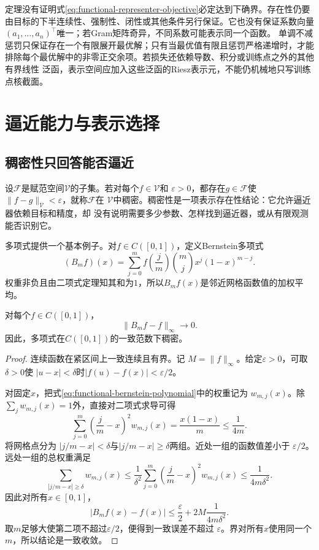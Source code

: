 定理没有证明式\eqref{eq:functional-representer-objective}必定达到下确界。存在性仍要
由目标的下半连续性、强制性、闭性或其他条件另行保证。它也没有保证系数向量
$(a_1,\ldots,a_n)^{\top}$唯一；若Gram矩阵奇异，不同系数可能表示同一个函数。
单调不减惩罚只保证存在一个有限展开最优解；只有当最优值有限且惩罚严格递增时，才能
排除每个最优解中的非零正交余项。若损失还依赖导数、积分或训练点之外的其他有界线性
泛函，表示空间应加入这些泛函的Riesz表示元，不能仍机械地只写训练点核截面。

\section{逼近能力与表示选择}
\label{sec:functional-approximation-capacity-representation}

\subsection{稠密性只回答能否逼近}

设$\mathcal{F}$是赋范空间$\mathcal{V}$的子集。若对每个$f\in\mathcal{V}$和
$\varepsilon>0$，都存在$g\in\mathcal{F}$使
$\lVert f-g\rVert_{\mathcal{V}}<\varepsilon$，就称$\mathcal{F}$在
$\mathcal{V}$中稠密。稠密性是一项表示存在性结论：它允许逼近器依赖目标和精度，却
没有说明需要多少参数、怎样找到逼近器，或从有限观测能否识别它。

多项式提供一个基本例子。对$f\in C([0,1])$，定义Bernstein多项式
\begin{equation}
  (B_mf)(x)
  =
  \sum_{j=0}^{m}
  f\left(\frac{j}{m}\right)
  \binom{m}{j}x^j(1-x)^{m-j}.
  \label{eq:functional-bernstein-polynomial}
\end{equation}
权重非负且由二项式定理知其和为$1$，所以$B_mf(x)$是邻近网格函数值的加权平均。

\begin{theorem}[Bernstein逼近定理]
\label{thm:functional-weierstrass-bernstein}
对每个$f\in C([0,1])$，
\[
  \lVert B_mf-f\rVert_{\infty}\longrightarrow0.
\]
因此，多项式在$C([0,1])$的一致范数下稠密。
\end{theorem}

\begin{proof}
连续函数在紧区间上一致连续且有界。记
$M=\lVert f\rVert_{\infty}$。给定$\varepsilon>0$，可取$\delta>0$使
$|u-x|<\delta$时$|f(u)-f(x)|<\varepsilon/2$。

对固定$x$，把式\eqref{eq:functional-bernstein-polynomial}中的权重记为
$w_{m,j}(x)$。除$\sum_jw_{m,j}(x)=1$外，直接对二项式求导可得
\[
  \sum_{j=0}^{m}
  \left(\frac{j}{m}-x\right)^2w_{m,j}(x)
  =
  \frac{x(1-x)}{m}
  \leq\frac{1}{4m}.
\]
将网格点分为
$|j/m-x|<\delta$与$|j/m-x|\geq\delta$两组。近处一组的函数值差小于
$\varepsilon/2$。远处一组的总权重满足
\[
  \sum_{|j/m-x|\geq\delta}w_{m,j}(x)
  \leq
  \frac{1}{\delta^2}
  \sum_{j=0}^{m}
  \left(\frac{j}{m}-x\right)^2w_{m,j}(x)
  \leq\frac{1}{4m\delta^2}.
\]
因此对所有$x\in[0,1]$，
\[
  |B_mf(x)-f(x)|
  \leq
  \frac{\varepsilon}{2}
  +
  2M\frac{1}{4m\delta^2}.
\]
取$m$足够大使第二项不超过$\varepsilon/2$，便得到一致误差不超过
$\varepsilon$。界对所有$x$使用同一个$m$，所以结论是一致收敛。
\end{proof}

